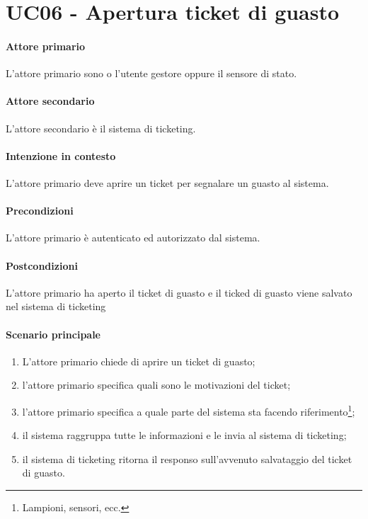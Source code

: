 \section{UC06 - Apertura ticket di guasto}\label{uc:06}

\paragraph{Attore primario} L'attore primario sono o l'utente gestore oppure il sensore di stato.

\paragraph{Attore secondario} L'attore secondario è il sistema di ticketing.

\paragraph{Intenzione in contesto} L'attore primario deve aprire un ticket per segnalare un guasto al sistema.

\paragraph{Precondizioni} L'attore primario è autenticato ed autorizzato dal sistema.

\paragraph{Postcondizioni} L'attore primario ha aperto il ticket di guasto e il ticked di guasto viene salvato nel sistema di ticketing

\paragraph{Scenario principale}

\begin{enumerate}
    \item L'attore primario chiede di aprire un ticket di guasto;
    \item l'attore primario specifica quali sono le motivazioni del ticket;
    \item l'attore primario specifica a quale parte del sistema sta facendo riferimento\footnote{Lampioni, sensori, ecc.};
    \item il sistema raggruppa tutte le informazioni e le invia al sistema di ticketing;
    \item il sistema di ticketing ritorna il responso sull'avvenuto salvataggio del ticket di guasto.
\end{enumerate}
